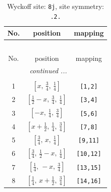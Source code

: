 \documentclass[fleqn,8pt]{jsarticle}
\begin{document}
\begin{longtable}{ccc}
\caption{Wyckoff site: {\tt 8j}, site symmetry: {\tt .2.}}
 \\
 \hline \hline
No. & position & mapping \\ \hline \endfirsthead

\multicolumn{2}{l}{\tablename\ \thetable{}} \\
 \hline \hline
No. & position & mapping \\ \hline \endhead

 \hline \hline
\multicolumn{2}{r}{\footnotesize\it continued ...} \\ \endfoot

 \hline \hline
\multicolumn{2}{r}{} \\ \endlastfoot

1 & $\left[ x,\, \frac{3}{4},\, \frac{1}{4} \right]$ & {\tt [1,2]} \\ \hline
2 & $\left[ \frac{1}{2} - x,\, \frac{3}{4},\, \frac{1}{4} \right]$ & {\tt [3,4]} \\ \hline
3 & $\left[ - x,\, \frac{1}{4},\, \frac{3}{4} \right]$ & {\tt [5,6]} \\ \hline
4 & $\left[ x + \frac{1}{2},\, \frac{1}{4},\, \frac{3}{4} \right]$ & {\tt [7,8]} \\ \hline
5 & $\left[ \frac{3}{4},\, x,\, \frac{1}{4} \right]$ & {\tt [9,11]} \\ \hline
6 & $\left[ \frac{3}{4},\, \frac{1}{2} - x,\, \frac{1}{4} \right]$ & {\tt [10,12]} \\ \hline
7 & $\left[ \frac{1}{4},\, - x,\, \frac{3}{4} \right]$ & {\tt [13,15]} \\ \hline
8 & $\left[ \frac{1}{4},\, x + \frac{1}{2},\, \frac{3}{4} \right]$ & {\tt [14,16]} \\
\end{longtable}
\renewcommand{\arraystretch}{1.2}
\end{document}
